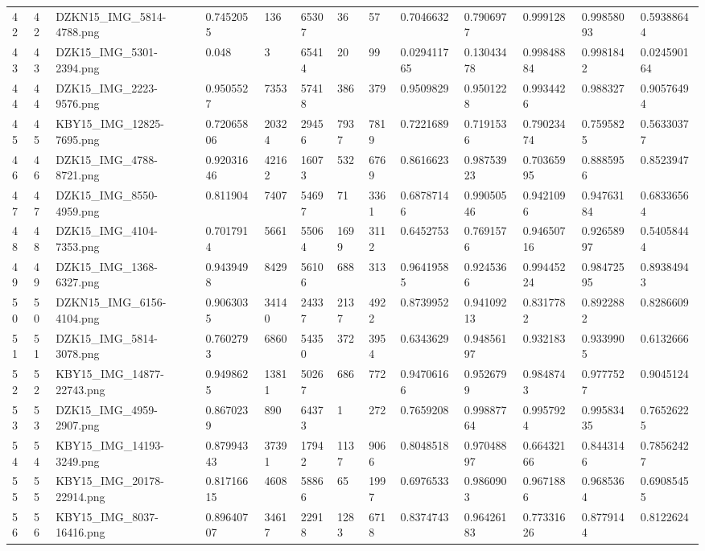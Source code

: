 \documentclass[11pt, a4paper, twoside]{report}
\begin{document}
\begin{longtable}[c]{@{}lllllllllllll@{}}
42 & 42 & DZKN15\_IMG\_5814-4788.png & 0.7452055 & 136 & 65307 & 36 & 57 & 0.7046632 & 0.7906977 & 0.999128 & 0.99858093 & 0.59388644 \\
43 & 43 & DZK15\_IMG\_5301-2394.png & 0.048 & 3 & 65414 & 20 & 99 & 0.029411765 & 0.13043478 & 0.99848884 & 0.9981842 & 0.024590164 \\
44 & 44 & DZK15\_IMG\_2223-9576.png & 0.9505527 & 7353 & 57418 & 386 & 379 & 0.9509829 & 0.9501228 & 0.9934426 & 0.988327 & 0.90576494 \\
45 & 45 & KBY15\_IMG\_12825-7695.png & 0.72065806 & 20324 & 29456 & 7937 & 7819 & 0.7221689 & 0.7191536 & 0.79023474 & 0.7595825 & 0.56330377 \\
46 & 46 & DZK15\_IMG\_4788-8721.png & 0.92031646 & 42162 & 16073 & 532 & 6769 & 0.8616623 & 0.98753923 & 0.70365995 & 0.8885956 & 0.8523947 \\
47 & 47 & DZK15\_IMG\_8550-4959.png & 0.811904 & 7407 & 54697 & 71 & 3361 & 0.68787146 & 0.99050546 & 0.9421096 & 0.94763184 & 0.68336564 \\
48 & 48 & DZK15\_IMG\_4104-7353.png & 0.7017914 & 5661 & 55064 & 1699 & 3112 & 0.6452753 & 0.7691576 & 0.94650716 & 0.92658997 & 0.54058444 \\
49 & 49 & DZK15\_IMG\_1368-6327.png & 0.9439498 & 8429 & 56106 & 688 & 313 & 0.96419585 & 0.9245366 & 0.99445224 & 0.98472595 & 0.89384943 \\
50 & 50 & DZKN15\_IMG\_6156-4104.png & 0.9063035 & 34140 & 24337 & 2137 & 4922 & 0.8739952 & 0.94109213 & 0.8317782 & 0.8922882 & 0.8286609 \\
51 & 51 & DZK15\_IMG\_5814-3078.png & 0.7602793 & 6860 & 54350 & 372 & 3954 & 0.6343629 & 0.94856197 & 0.932183 & 0.9339905 & 0.6132666 \\
52 & 52 & KBY15\_IMG\_14877-22743.png & 0.9498625 & 13811 & 50267 & 686 & 772 & 0.94706166 & 0.9526799 & 0.9848743 & 0.9777527 & 0.9045124 \\
53 & 53 & DZK15\_IMG\_4959-2907.png & 0.8670239 & 890 & 64373 & 1 & 272 & 0.7659208 & 0.99887764 & 0.9957924 & 0.99583435 & 0.76526225 \\
54 & 54 & KBY15\_IMG\_14193-3249.png & 0.87994343 & 37391 & 17942 & 1137 & 9066 & 0.8048518 & 0.97048897 & 0.66432166 & 0.8443146 & 0.78562427 \\
55 & 55 & KBY15\_IMG\_20178-22914.png & 0.81716615 & 4608 & 58866 & 65 & 1997 & 0.6976533 & 0.9860903 & 0.9671886 & 0.9685364 & 0.69085455 \\
56 & 56 & KBY15\_IMG\_8037-16416.png & 0.89640707 & 34617 & 22918 & 1283 & 6718 & 0.8374743 & 0.96426183 & 0.77331626 & 0.8779144 & 0.8122624 \\

\end{longtable}
\end{document}
